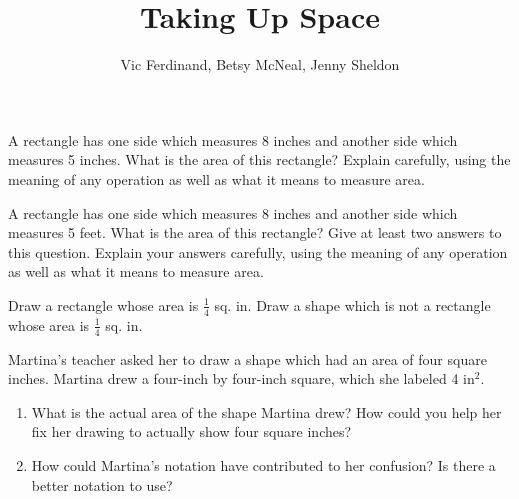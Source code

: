 \documentclass[nooutcomes]{ximera}
\title{Taking Up Space}
\author{Vic Ferdinand, Betsy McNeal, Jenny Sheldon}
\begin{document}
\begin{abstract}
\end{abstract}
\maketitle



\begin{problem}
A rectangle has one side which measures 8 inches and another side which measures 5 inches.  What is the area of this rectangle?  Explain carefully, using the meaning of any operation as well as what it means to measure area.


\end{problem}

\begin{problem}
A rectangle has one side which measures 8 inches and another side which measures 5 feet.  What is the area of this rectangle?  Give at least two answers to this question.  Explain your answers carefully, using the meaning of any operation as well as what it means to measure area.

\end{problem}


\begin{problem} \label{TakingUpSpace3}
Draw a rectangle whose area is $\frac{1}{4}$ sq. in.  Draw a shape which is not a rectangle whose area is $\frac{1}{4}$ sq. in.


\end{problem}

\begin{problem} \label{TakingUpSpace4}
Martina's teacher asked her to draw a shape which had an area of four square inches.  Martina drew a four-inch by four-inch square, which she labeled 4 in$^2$.

\begin{enumerate}
\item What is the actual area of the shape Martina drew?  How could you help her fix her drawing to actually show four square inches?
\item How could Martina's notation have contributed to her confusion?  Is there a better notation to use?
\end{enumerate}
\end{problem}

\newpage
\end{document}
